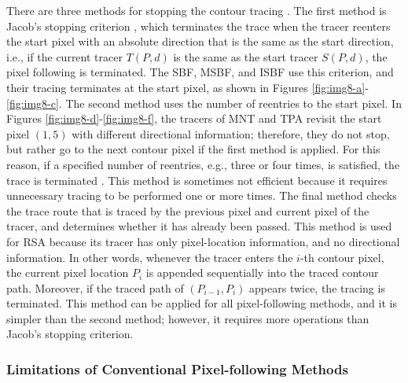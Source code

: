 There are three methods for stopping the contour tracing \cite{Ghuneim2015Contour,Reddy2012Evaluation}. The first method is Jacob's stopping criterion \cite{Ghuneim2015Contour}, which terminates the trace when the tracer reenters the start pixel with an absolute direction that is the same as the start direction, i.e., if the current tracer $T(P,d)$ is the same as the start tracer $S(P,d)$, the pixel following is terminated. The SBF, MSBF, and ISBF use this criterion, and their tracing terminates at the start pixel, as shown in Figures \ref{fig:img8-a}-\ref{fig:img8-c}. The second method uses the number of reentries to the start pixel. In Figures \ref{fig:img8-d}-\ref{fig:img8-f}, the tracers of MNT and TPA revisit the start pixel $(1, 5)$ with different directional information; therefore, they do not stop, but rather go to the next contour pixel if the first method is applied. For this reason, if a specified number of reentries, e.g., three or four times, is satisfied, the trace is terminated \cite{Reddy2012Evaluation}. This method is sometimes not efficient because it requires unnecessary tracing to be performed one or more times. The final method checks the trace route that is traced by the previous pixel and current pixel of the tracer, and determines whether it has already been passed. This method is used for RSA \cite{Ghuneim2015Contour,Mirante1982Radial} because its tracer has only pixel-location information, and no directional information. In other words, whenever the tracer enters the $i$-th contour pixel, the current pixel location $P_i$ is appended sequentially into the traced contour path. Moreover, if the traced path of $(P_{i-1}, P_i)$ appears twice, the tracing is terminated. This method can be applied for all pixel-following methods, and it is simpler than the second method; however, it requires more operations than Jacob's stopping criterion.

\subsubsection{Limitations of Conventional Pixel-following Methods}

